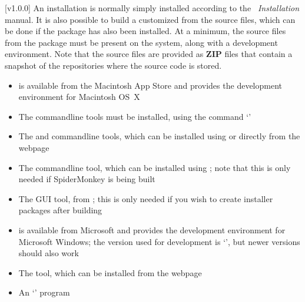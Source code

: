 [v1.0.0]
%
An \mplusm{} installation is normally simply installed according to the
\emph{\MMM{}~Installation} manual.
It is also possible to build a customized \mplusm{} from the source files, which can be
done if the  package has also been installed.
At a minimum, the source files from the  package must be present on the
system, along with a  development environment.
Note that the source files are provided as \textbf{ZIP} files that contain a snapshot of
the  repositories where the source code is stored.
\tertiaryEnd{}
\begin{itemize}
\item{} is available from the Macintosh App Store and provides the
 development environment for Macintosh OS~X
\item\exSp{} The  command\longDash{}line tools must be installed, using the
command `'
\item\exSp{} The  and  command\longDash{}line tools, which
can be installed using  or directly from the web\longDash{}page
\item\exSp{} The  command\longDash{}line tool, which can be installed
using ; note that this is only needed if SpiderMonkey is being built
\item\exSp{} The  GUI tool, from
;
this is only needed if you wish to create installer packages after building \mplusm
\end{itemize}
\tertiaryEnd{}
\begin{itemize}
\item{} is available from Microsoft and provides the 
development environment for Microsoft Windows; the version used for development is
`', but newer versions should also
work
\item\exSp{} The  tool, which can be installed from the web\longDash{}page
\item\exSp{} An `' program
\end{itemize}
